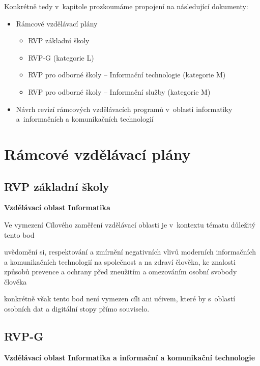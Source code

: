 Konkrétně tedy v~kapitole prozkoumáme propojení na následující dokumenty:

\begin{itemize}
\item Rámcové vzdělávací plány
	\begin{itemize}
    \item RVP základní školy \citep{rvp-zs}
    \item RVP-G (kategorie L) \citep{rvp-g}
    \item RVP pro odborné školy -- Informační technologie \citep{rvp-it} (kategorie M)
    \item RVP pro odborné školy -- Informační služby\citep{rvp-is} (kategorie M)
	\end{itemize}
\item Návrh revizí rámcových vzdělávacích programů v oblasti informatiky a informačních a komunikačních technologií \citep{revize}
\end{itemize}

\section{Rámcové vzdělávací plány}

\subsection{RVP základní školy}

\textbf{Vzdělávací oblast Informatika}

Ve vymezení Cílového zaměření vzdělávací oblasti je v~kontextu tématu důležitý tento bod

\begin{displayquote}
uvědomění si, respektování a zmírnění negativních vlivů moderních informačních a komunikačních technologií na společnost a na zdraví člověka, ke znalosti způsobů prevence a ochrany před zneužitím a omezováním osobní svobody člověka
\end{displayquote}

konkrétně však tento bod není vymezen cíli ani učivem, které by s~oblastí osobních dat a digitální stopy přímo souviselo.

\subsection{RVP-G}

\textbf{Vzdělávací oblast Informatika a informační a komunikační technologie}

